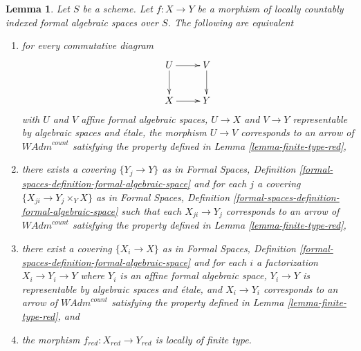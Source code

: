 \documentclass[10pt,a4paper]{amsart}
\theoremstyle{plain}
\newtheorem{lemma}[subsection]{Lemma}
\theoremstyle{definition}
\theoremstyle{remark}
\numberwithin{equation}{subsection}
\begin{document}
\begin{lemma}
\label{lemma-finite-type-red-morphisms}
Let $S$ be a scheme. Let $f : X \to Y$ be a morphism of
locally countably indexed formal algebraic spaces over $S$.
The following are equivalent
\begin{enumerate}
\item for every commutative diagram
$$
\xymatrix{
U \ar[d] \ar[r] & V \ar[d] \\
X \ar[r] & Y
}
$$
with $U$ and $V$ affine formal algebraic spaces, $U \to X$ and $V \to Y$
representable by algebraic spaces and \'etale, the morphism $U \to V$
corresponds to an arrow of $\textit{WAdm}^{count}$ satisfying the
property defined in Lemma \ref{lemma-finite-type-red},
\item there exists a covering $\{Y_j \to Y\}$ as in
Formal Spaces,
Definition \ref{formal-spaces-definition-formal-algebraic-space}
and for each $j$
a covering $\{X_{ji} \to Y_j \times_Y X\}$ as in
Formal Spaces,
Definition \ref{formal-spaces-definition-formal-algebraic-space}
such that each $X_{ji} \to Y_j$  corresponds
to an arrow of $\textit{WAdm}^{count}$ satisfying the
property defined in Lemma \ref{lemma-finite-type-red},
\item there exist a covering $\{X_i \to X\}$ as in
Formal Spaces,
Definition \ref{formal-spaces-definition-formal-algebraic-space}
and for each $i$ a factorization $X_i \to Y_i \to Y$ where $Y_i$
is an affine formal algebraic space, $Y_i \to Y$ is representable
by algebraic spaces and \'etale, and $X_i \to Y_i$ corresponds
to an arrow of $\textit{WAdm}^{count}$ satisfying the
property defined in Lemma \ref{lemma-finite-type-red}, and
\item the morphism $f_{red} : X_{red} \to Y_{red}$ is locally of finite type.
\end{enumerate}
\end{lemma}
\end{document}
